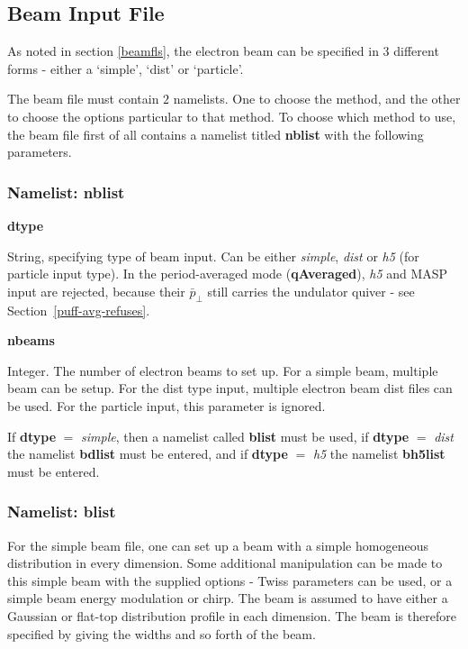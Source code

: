 \documentclass[12pt]{article}%
\begin{document}
\newpage

\subsection{Beam Input File}

As noted in section \ref{beamfls}, the electron beam can be specified in 3 different forms - either a `simple', `dist' or `particle'.

The beam file must contain $2$ namelists. One to choose the method, and the other to choose the options particular to that method. To choose which method to use, the beam file first of all contains a namelist titled {\bf nblist} with the following parameters.

\subsubsection{Namelist: nblist}

{\bf dtype}

String, specifying type of beam input. Can be either {\it simple}, {\it dist} or {\it h5} (for particle input type). In the period-averaged mode ({\bf qAveraged}), {\it h5} and MASP input are rejected, because their $\bar{p}_\bot$ still carries the undulator quiver - see Section~\ref{puff-avg-refuses}.

{\bf nbeams}

Integer. The number of electron beams to set up. For a simple beam, multiple beam can be setup. For the dist type input, multiple electron beam dist files can be used. For the particle input, this parameter is ignored.

If {\bf dtype} $=$ {\it simple}, then a namelist called {\bf blist} must be used, if {\bf dtype} $=$ {\it dist} the namelist {\bf bdlist} must be entered, and if {\bf dtype} $=$ {\it h5} the namelist {\bf bh5list} must be entered.

\subsubsection{Namelist: blist}

For the simple beam file, one can set up a beam with a simple homogeneous distribution in every dimension. Some additional manipulation can be made to this simple beam with the supplied options - Twiss parameters can be used, or a simple beam energy modulation or chirp. The beam is assumed to have either a Gaussian or flat-top distribution profile in each dimension. The beam is therefore specified by giving the widths and so forth of the beam.
\end{document}
